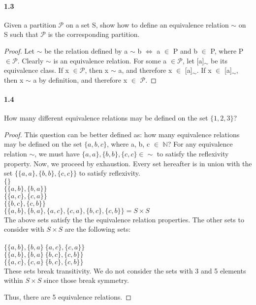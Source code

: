 \documentclass{book}
\begin{document}
\paragraph{1.3} Given a partition $\mathscr{P}$ on a set S, show how to define an equivalence relation $\sim$ on S such that $\mathscr{P}$ is the corresponding partition.
\begin{proof}
Let $\sim$ be the relation defined by a $\sim$ b $\iff$ a $\in$ P and b $\in$ P, where P $\in \mathscr{P}$. Clearly $\sim$ is an equivalence relation. For some a $\in \mathscr{P}$, let [a]\textsubscript{$\sim$} be its equivalence class. If x $\in \mathscr{P}$, then x $\sim$ a, and therefore x $\in$ [a]\textsubscript{$\sim$}. If x $\in$ [a]\textsubscript{$\sim$}, then x $\sim$ a by definition, and therefore x $\in$ $\mathscr{P}$.
\end{proof}
\paragraph{1.4} How many different equivalence relations may be defined on the set $\{1, 2, 3\}$?
\begin{proof}
This question can be better defined as: how many equivalence relations may be defined on the set $\{a, b, c\}$, where a, b, c $\in$ $\mathbb{N}$? For any equivalence relation $\sim$, we must have $\{a, a\}, \{b, b\}, \{c, c\} \in \sim$ to satisfy the reflexivity property. Now, we proceed by exhaustion. Every set hereafter is in union with the set $\{\{a, a\}, \{b, b\}, \{c, c\}\}$ to satisfy reflexivity.
\\
$\{\}$ \\
$\{\{a, b\},\{b, a\}\}$\\
$\{\{a, c\},\{c, a\}\}$\\
$\{\{b, c\},\{c, b\}\}$\\
$\{\{a, b\},\{b, a\}, \{a, c\},\{c, a\}, \{b, c\},\{c, b\}\} = S \times S$\\

The above sets satisfy the the equivalence relation properties. The other sets to consider with $S \times S$ are the following sets:
\\
\\
$\{\{a, b\},\{b, a\}\ \{a, c\},\{c, a\}\}$\\
$\{\{a, b\},\{b, a\}\ \{b, c\},\{c, b\}\}$\\
$\{\{a, c\},\{c, a\}\ \{b, c\},\{c, b\}\}$\\

These sets break transitivity. We do not consider the sets with 3 and 5 elements within $S \times S$ since those break symmetry. 

Thus, there are 5 equivalence relations.
\end{proof}
\end{document}
